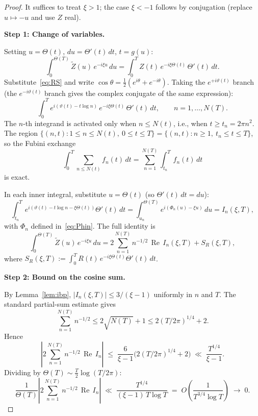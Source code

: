 \documentclass[12pt]{amsart}
\theoremstyle{definition}
\theoremstyle{remark}
\DeclareMathOperator{\re}{Re}
\newcommand{\Th}{\Theta}
\newcommand{\vth}{\vartheta}
\newcommand{\Zt}{\widetilde{Z}}
\begin{document}
\begin{proof}
It suffices to treat $\xi>1$; the case $\xi<-1$ follows by conjugation
(replace $u\mapsto -u$ and use $Z$ real).

\medskip
\noindent\textbf{Step 1: Change of variables.}

Setting $u=\Th(t)$, $du=\Th'(t)\,dt$, $t=g(u)$:
\begin{equation}\label{eq:cov}
  \int_0^{\Th(T)}\Zt(u)\,e^{-i\xi u}\,du
  = \int_0^{T} Z(t)\,e^{-i\xi\Th(t)}\,\Th'(t)\,dt.
\end{equation}
Substitute~\eqref{eq:RS} and write
$\cos\theta=\tfrac{1}{2}(e^{i\theta}+e^{-i\theta})$.
Taking the $e^{+i\vth(t)}$ branch (the $e^{-i\vth(t)}$ branch gives
the complex conjugate of the same expression):
\begin{equation}\label{eq:Jtilde}
  \int_0^T e^{i(\vth(t)-t\log n)}\,e^{-i\xi\Th(t)}\,\Th'(t)\,dt,
  \qquad n=1,\dots,N(T).
\end{equation}
The $n$-th integrand is activated only when $n\le N(t)$, i.e., when
$t\ge t_n=2\pi n^2$.  The region
$\{(n,t):1\le n\le N(t),\ 0\le t\le T\}
=\{(n,t):n\ge 1,\ t_n\le t\le T\}$,
so the Fubini exchange
\begin{equation}\label{eq:fubini}
  \int_0^T\!\!\sum_{n\le N(t)}f_n(t)\,dt
  = \sum_{n=1}^{N(T)}\int_{t_n}^{T}f_n(t)\,dt
\end{equation}
is exact.

In each inner integral, substitute $u=\Th(t)$ (so $\Th'(t)\,dt=du$):
\[
  \int_{t_n}^T e^{i(\vth(t)-t\log n-\xi\Th(t))}\Th'(t)\,dt
  = \int_{u_n}^{\Th(T)} e^{i(\Phi_n(u)-\xi u)}\,du
  = I_n(\xi,T),
\]
with $\Phi_n$ defined in~\eqref{eq:Phin}.  The full identity is
\begin{equation}\label{eq:fullid}
  \int_0^{\Th(T)}\Zt(u)\,e^{-i\xi u}\,du
  = 2\sum_{n=1}^{N(T)} n^{-1/2}\,\re\,I_n(\xi,T) + S_R(\xi,T),
\end{equation}
where $S_R(\xi,T):=\int_0^T R(t)\,e^{-i\xi\Th(t)}\Th'(t)\,dt$.

\medskip
\noindent\textbf{Step 2: Bound on the cosine sum.}

By Lemma~\ref{lem:ibp}, $|I_n(\xi,T)|\le 3/(\xi-1)$ uniformly in $n$
and $T$.  The standard partial-sum estimate gives
\[
  \sum_{n=1}^{N(T)} n^{-1/2}
  \le 2\sqrt{N(T)}+1
  \le 2(T/2\pi)^{1/4}+2.
\]
Hence
\begin{equation}\label{eq:cosbound}
  \left|2\sum_{n=1}^{N(T)} n^{-1/2}\,\re\,I_n\right|
  \;\le\; \frac{6}{\xi-1}\bigl(2(T/2\pi)^{1/4}+2\bigr)
  \;\ll\; \frac{T^{1/4}}{\xi-1}.
\end{equation}
Dividing by $\Th(T)\sim\tfrac{T}{2}\log(T/2\pi)$:
\begin{equation}\label{eq:costerm}
  \frac{1}{\Th(T)}\left|2\sum_{n=1}^{N(T)} n^{-1/2}\,\re\,I_n\right|
  \;\ll\; \frac{T^{1/4}}{(\xi-1)\,T\log T}
  \;=\; O\!\left(\frac{1}{T^{3/4}\log T}\right)
  \;\to\; 0.
\end{equation}


\end{proof}
\end{document}
